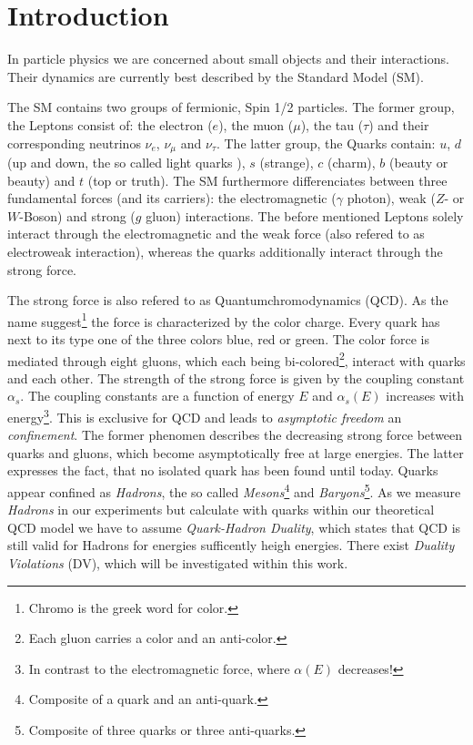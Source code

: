 \documentclass[../../index.tex]{subfiles}
\begin{document}
\chapter{Introduction}
In particle physics we are concerned about small objects and their interactions.
Their dynamics are currently best described by the Standard Model (SM).

The SM contains two groups of fermionic, Spin 1/2 particles. The former group,
the Leptons consist of: the electron ($e$), the muon ($\mu$), the tau ($\tau$)
and their corresponding neutrinos $\nu_e$, $\nu_\mu$ and $\nu_\tau$. The latter
group, the Quarks contain: $u$, $d$ (up and down, the so called light quarks ),
$s$ (strange), $c$ (charm), $b$ (beauty or beauty) and $t$ (top or truth). The SM
furthermore differenciates between three fundamental forces (and its carriers):
the electromagnetic ($\gamma$ photon), weak ($Z$- or $W$-Boson) and strong ($g$
gluon) interactions. The before mentioned Leptons solely interact through the
electromagnetic and the weak force (also refered to as electroweak interaction),
whereas the quarks additionally interact through the strong force.

The strong force is also refered to as Quantumchromodynamics
(QCD). As the name suggest\footnote{Chromo is the greek word for color.} the
force is characterized by the color charge. Every quark has next to its type one
of the three colors blue, red or green. The color force is mediated through
eight gluons, which each being bi-colored\footnote{Each gluon carries a color
  and an anti-color.}, interact with quarks and each other. The strength of the
strong force is given by the coupling constant $\alpha_s$. The coupling
constants are a function of energy $E$ and $\alpha_s(E)$ increases with 
energy\footnote{In contrast to the electromagnetic force, where $\alpha(E)$
  decreases!}. This is exclusive for QCD and leads to \textit{asymptotic freedom} an
\textit{confinement}. The former phenomen describes the decreasing strong force
between quarks and gluons, which become asymptotically free at large
energies. The latter expresses the fact, that no isolated quark has been found
until today. Quarks appear confined as \textit{Hadrons}, the so called
\textit{Mesons}\footnote{Composite of a quark and an anti-quark.} and
\textit{Baryons}\footnote{Composite of three quarks or three anti-quarks.}.
As we measure \textit{Hadrons} in our experiments but calculate with quarks
within our theoretical QCD model we have to assume \textit{Quark-Hadron
  Duality}, which states that QCD is still valid for Hadrons for energies
sufficently heigh energies. There exist \textit{Duality Violations} (DV), which
will be investigated within this work.
\end{document}
